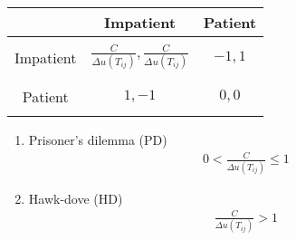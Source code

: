 \begin{tabularx}{1.0\linewidth}{ c | C | C }
& Impatient & Patient \\
\hline
&& \\
Impatient & $ \frac{C}{\Delta u(T_{ij})}, \frac{C}{\Delta u(T_{ij})} $ & $ -1, 1 $ \\
&& \\
\hline
&& \\
Patient & $ 1, -1 $ & $ 0, 0 $ \\
&& \\
\end{tabularx}

\vspace{1.0cm}

\begin{enumerate}[label=\roman{enumi})]
\item Prisoner's dilemma (PD)
\begin{align}
0 < \frac{C}{\Delta u(T_{ij})} \leq 1
\end{align}

\item Hawk-dove (HD)
\begin{align}
\frac{C}{\Delta u(T_{ij})} > 1
\end{align}

\end{enumerate}
